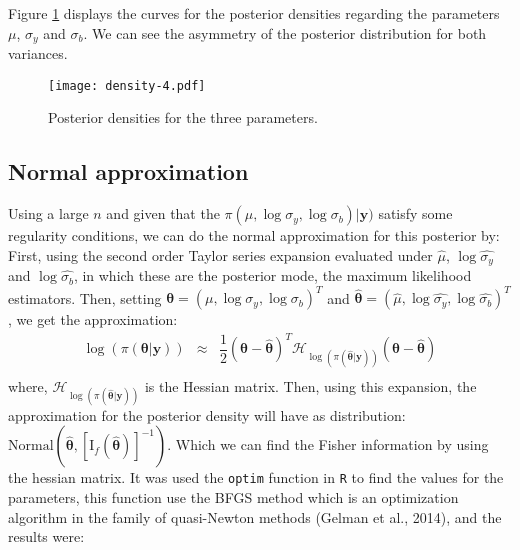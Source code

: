 \documentclass{asaproc}
\begin{document}
Figure \ref{Fig2} displays the curves for the posterior densities regarding the parameters $\mu$, $\sigma_y$ and $\sigma_b$. We can see the asymmetry of the posterior distribution for both variances. 

\begin{figure}[H]
\centering
\caption{Posterior densities for the three parameters.}
\label{Fig2}
\texttt{[image: density-4.pdf]}
\end{figure}


\subsection{Normal approximation}\label{nap}

Using a large $n$ and given that the $\pi(\mu, \log\sigma_y,\log\sigma_b)|\textbf{y})$ satisfy some regularity conditions, we can do the normal approximation for this posterior by: First, using the second order Taylor series expansion evaluated under $\hat{\mu}$, $\log\hat{\sigma_y}$ and $\log\hat{\sigma_b}$, in which these are the posterior mode, the maximum likelihood estimators. Then, setting $\boldsymbol{\theta} = (\mu, \log\sigma_y, \log\sigma_b)^T$ and $\boldsymbol{\hat{\theta}} = (\hat{\mu}, \log\hat{\sigma_y}, \log\hat{\sigma_b})^T$, we get the approximation:
\begin{equation*}
\begin{array}{lclll}
\log(\pi(\boldsymbol{\theta}|\textbf{y})) & \approx & \dfrac{1}{2} (\boldsymbol{\theta} - \boldsymbol{\hat{\theta}})^T \mathcal{H}_{ \log(\pi(\boldsymbol{\hat{\theta}}|\textbf{y}))}(\boldsymbol{\theta} - \boldsymbol{\hat{\theta}})\\
\end{array} 
\label{eq1}
\end{equation*}
\noindent
where, $\mathcal{H}_{ \log(\pi(\boldsymbol{\hat{\theta}}|\textbf{y}))}$ is the Hessian matrix. Then, using this expansion, the approximation for the posterior density will have as distribution: $\mbox{Normal} \left(\boldsymbol{\hat{\theta}}, [\mbox{I}_f(\boldsymbol{\hat{\theta}})]^{-1}  \right)$. Which we can find the Fisher information by using the hessian matrix. It was used the \texttt{optim} function in \texttt{R} to find the values for the parameters, this function use the BFGS method which is an optimization algorithm in the family of quasi-Newton methods (Gelman et al., 2014), and the results were: 
\end{document}
